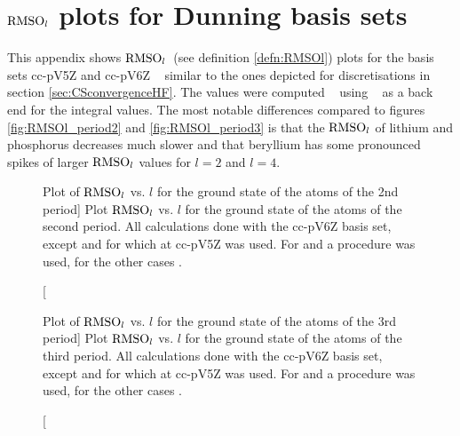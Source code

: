 \chapter{$\text{RMSO}_l$ plots for Dunning basis sets}
\label{apx:GaussianUHF}

This appendix shows $\text{RMSO}_l$~(see definition \vref{defn:RMSOl})
plots for the \cGTO basis sets
cc-pV5Z and cc-pV6Z%
~\cite{Dunning1989,Woon1993,Wilson1996,VanMourik2000,Prascher2011}
similar to the ones depicted for \CS discretisations
in section \vref{sec:CSconvergenceHF}.
The values were computed \molsturm~\cite{molsturmWeb,molsturmDesign}
using \libint~\cite{Libint2_231} as a back end
for the integral values.
The most notable differences compared to figures \ref{fig:RMSOl_period2}
and \vref{fig:RMSOl_period3}
is that the $\text{RMSO}_l$ of lithium and phosphorus
decreases much slower and
that beryllium has some pronounced spikes of larger $\text{RMSO}_l$
values for $l=2$ and $l=4$.

\begin{figure}[hp!]
	\centering
	\caption
	[Plot of $\text{RMSO}_l$ vs. $l$ for the \HF ground state of the atoms of the 2nd period]
	{
		Plot $\text{RMSO}_l$ vs. $l$ for the \HF ground state
		of the atoms of the second period.
		All calculations done with the cc-pV6Z basis set,
		except  and 
		for which at cc-pV5Z was used.
		For  and  a \RHF procedure was used,
		for the other cases \UHF.
	}
	\label{fig:RMSO_period2_l}
\end{figure}

\begin{figure}[hp!]
	\centering
	\caption
	[Plot of $\text{RMSO}_l$ vs. $l$ for the \HF ground state of the atoms of the 3rd period]
	{
		Plot $\text{RMSO}_l$ vs. $l$ for the \HF ground state
		of the atoms of the third period.
		All calculations done with the cc-pV6Z basis set,
		except  and 
		for which at cc-pV5Z was used.
		For  and  a \RHF procedure was used,
		for the other cases \UHF.
	}
	\label{fig:RMSO_period3_l}
\end{figure}

%

